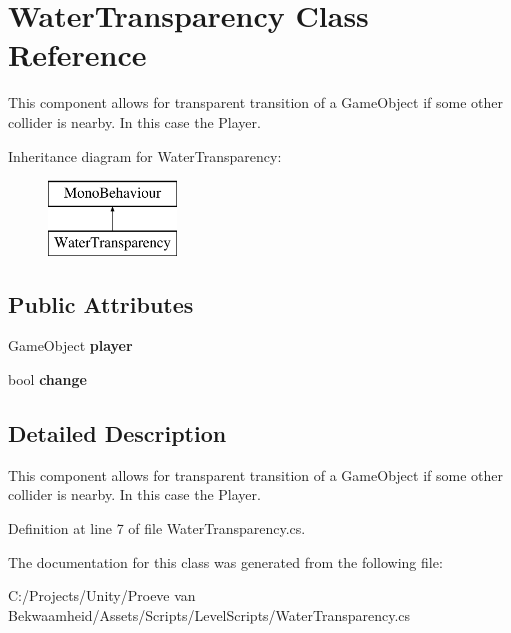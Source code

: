 \hypertarget{class_water_transparency}{\section{Water\+Transparency Class Reference}
\label{class_water_transparency}
}


This component allows for transparent transition of a Game\+Object if some other collider is nearby. In this case the Player.  


Inheritance diagram for Water\+Transparency\+:\begin{figure}[H]
\begin{center}
\leavevmode
\includegraphics[height=2.000000cm]{class_water_transparency}
\end{center}
\end{figure}
\subsection*{Public Attributes}
\begin{DoxyCompactItemize}
\item 
\hypertarget{class_water_transparency_ac96cfbea16b8832ac2ac3ca56aada830}{Game\+Object {\bfseries player}}\label{class_water_transparency_ac96cfbea16b8832ac2ac3ca56aada830}

\item 
\hypertarget{class_water_transparency_a4b2b69526abb0b842ed31bef14e236f0}{bool {\bfseries change}}\label{class_water_transparency_a4b2b69526abb0b842ed31bef14e236f0}

\end{DoxyCompactItemize}


\subsection{Detailed Description}
This component allows for transparent transition of a Game\+Object if some other collider is nearby. In this case the Player. 



Definition at line 7 of file Water\+Transparency.\+cs.



The documentation for this class was generated from the following file\+:\begin{DoxyCompactItemize}
\item 
C\+:/\+Projects/\+Unity/\+Proeve van Bekwaamheid/\+Assets/\+Scripts/\+Level\+Scripts/Water\+Transparency.\+cs\end{DoxyCompactItemize}
